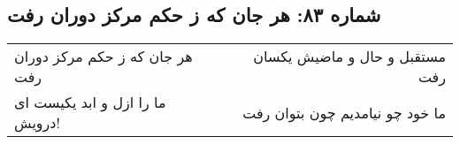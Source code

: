 \begin{center}
\section*{شماره ۸۳: هر جان که ز حکم مرکز دوران رفت}
\label{sec:083}
\begin{longtable}{l p{0.5cm} r}
هر جان که ز حکم مرکز دوران رفت
&&
مستقبل و حال و ماضیش یکسان رفت
\\
ما را ازل و ابد یکیست ای درویش!
&&
ما خود چو نیامدیم چون بتوان رفت
\\
\end{longtable}
\end{center}
